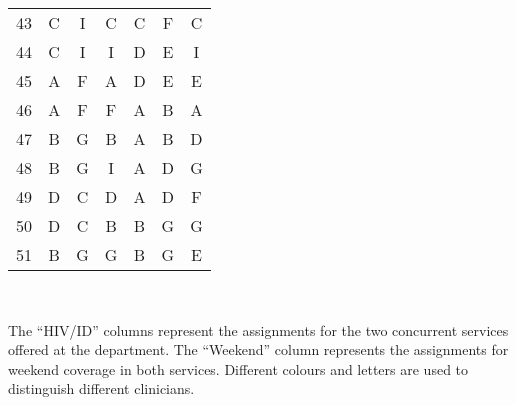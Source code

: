 \begin{table}[htbp]
\begin{adjustbox}{scale=0.8}
\begin{tabular}{c||ccc||ccc}
    43    & \cellcolor[rgb]{ 1,  .851,  .4}C & \cellcolor[rgb]{ .251,  .251,  .251}\textcolor[rgb]{ 1,  1,  1}{I} & \cellcolor[rgb]{ 1,  .851,  .4}C & \cellcolor[rgb]{ 1,  .851,  .4}C & \cellcolor[rgb]{ .557,  .663,  .859}F & \cellcolor[rgb]{ 1,  .851,  .4}C \\
    44    & \cellcolor[rgb]{ 1,  .851,  .4}C & \cellcolor[rgb]{ .251,  .251,  .251}\textcolor[rgb]{ 1,  1,  1}{I} & \cellcolor[rgb]{ .251,  .251,  .251}\textcolor[rgb]{ 1,  1,  1}{I} & \cellcolor[rgb]{ .788,  .788,  .788}D & \cellcolor[rgb]{ .957,  .69,  .518}E & \cellcolor[rgb]{ .251,  .251,  .251}\textcolor[rgb]{ 1,  1,  1}{I} \\
    45    & \cellcolor[rgb]{ .663,  .816,  .557}A & \cellcolor[rgb]{ .557,  .663,  .859}F & \cellcolor[rgb]{ .663,  .816,  .557}A & \cellcolor[rgb]{ .788,  .788,  .788}D & \cellcolor[rgb]{ .957,  .69,  .518}E & \cellcolor[rgb]{ .957,  .69,  .518}E \\
    46    & \cellcolor[rgb]{ .663,  .816,  .557}A & \cellcolor[rgb]{ .557,  .663,  .859}F & \cellcolor[rgb]{ .557,  .663,  .859}F & \cellcolor[rgb]{ .663,  .816,  .557}A & \cellcolor[rgb]{ .608,  .761,  .902}B & \cellcolor[rgb]{ .663,  .816,  .557}A \\
    47    & \cellcolor[rgb]{ .608,  .761,  .902}B & \cellcolor[rgb]{ .518,  .592,  .69}G & \cellcolor[rgb]{ .608,  .761,  .902}B & \cellcolor[rgb]{ .663,  .816,  .557}A & \cellcolor[rgb]{ .608,  .761,  .902}B & \cellcolor[rgb]{ .788,  .788,  .788}D \\
    48    & \cellcolor[rgb]{ .608,  .761,  .902}B & \cellcolor[rgb]{ .518,  .592,  .69}G & \cellcolor[rgb]{ .251,  .251,  .251}\textcolor[rgb]{ 1,  1,  1}{I} & \cellcolor[rgb]{ .663,  .816,  .557}A & \cellcolor[rgb]{ .788,  .788,  .788}D & \cellcolor[rgb]{ .518,  .592,  .69}G \\
    49    & \cellcolor[rgb]{ .788,  .788,  .788}D & \cellcolor[rgb]{ 1,  .851,  .4}C & \cellcolor[rgb]{ .788,  .788,  .788}D & \cellcolor[rgb]{ .663,  .816,  .557}A & \cellcolor[rgb]{ .788,  .788,  .788}D & \cellcolor[rgb]{ .557,  .663,  .859}F \\
    50    & \cellcolor[rgb]{ .788,  .788,  .788}D & \cellcolor[rgb]{ 1,  .851,  .4}C & \cellcolor[rgb]{ .608,  .761,  .902}B & \cellcolor[rgb]{ .608,  .761,  .902}B & \cellcolor[rgb]{ .518,  .592,  .69}G & \cellcolor[rgb]{ .518,  .592,  .69}G \\
    51    & \cellcolor[rgb]{ .608,  .761,  .902}B & \cellcolor[rgb]{ .518,  .592,  .69}G & \cellcolor[rgb]{ .518,  .592,  .69}G & \cellcolor[rgb]{ .608,  .761,  .902}B & \cellcolor[rgb]{ .518,  .592,  .69}G & \cellcolor[rgb]{ .957,  .69,  .518}E \\
    \end{tabular}%
	\end{adjustbox}\\[1em]
	\footnotesize\raggedright
	The ``HIV/ID'' columns represent the assignments for the two concurrent services offered at the department. The ``Weekend'' column represents the assignments for weekend coverage in both services. Different colours and letters are used to distinguish different clinicians.
\end{table}%
